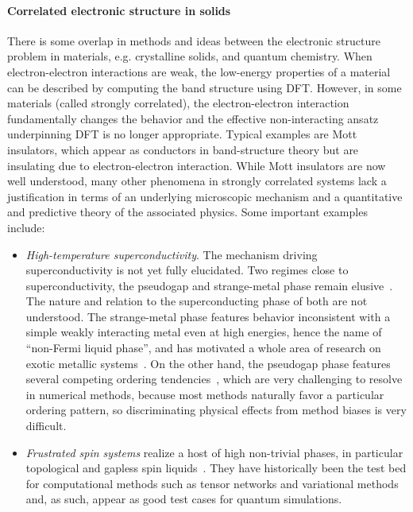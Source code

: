 \paragraph{Correlated electronic structure in solids}

There is some overlap in methods and ideas between the electronic structure problem in materials, e.g. crystalline solids, and quantum chemistry.
When electron-electron interactions are weak, the low-energy properties of a material can be described by computing the band structure using DFT. However, in some materials (called strongly correlated), the electron-electron interaction fundamentally changes the behavior and the effective non-interacting ansatz underpinning DFT is no longer appropriate. Typical examples are Mott insulators, which appear as conductors in band-structure theory but are insulating due to electron-electron interaction.
While Mott insulators are now well understood, many other phenomena in strongly correlated systems lack a justification in terms of an underlying microscopic mechanism and a quantitative and predictive theory of the associated physics.
Some important examples include:

\begin{itemize}
\item \textit{High-temperature superconductivity}. The mechanism driving superconductivity is not yet fully elucidated. Two regimes close to superconductivity, the {pseudogap} and {strange-metal} phase remain elusive~\cite{keimer2015quantum}. The nature and relation to the superconducting phase of both are not understood. The strange-metal phase features behavior inconsistent with a simple weakly interacting metal even at high energies, hence the name of ``non-Fermi liquid phase'', and has motivated a whole area of research on exotic metallic systems~\cite{lee2018recent}. On the other hand, the pseudogap phase features several competing ordering tendencies~\cite{fradkin2015intertwined}, which are very challenging to resolve in numerical methods, because most methods naturally favor a particular ordering pattern, so discriminating physical effects from method biases is very difficult.
\item \textit{Frustrated spin systems} realize a host of high non-trivial phases, in particular topological and gapless spin liquids~\cite{balents2010spin}. They have historically been the test bed for computational methods such as tensor networks and variational methods and, as such, appear as good test cases for quantum simulations.
\end{itemize}

